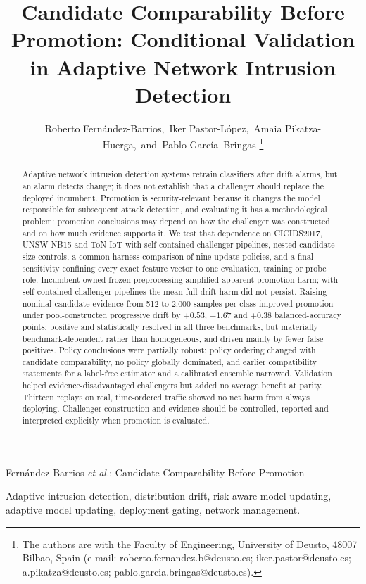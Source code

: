 \documentclass[journal]{IEEEtran}
\begin{document}
\title{Candidate Comparability Before Promotion: Conditional Validation in Adaptive Network Intrusion Detection}
\author{Roberto Fern\'andez-Barrios,~Iker Pastor-L\'opez,~Amaia Pikatza-Huerga,~and~Pablo Garc\'ia~Bringas%
\thanks{The authors are with the Faculty of Engineering, University of Deusto, 48007 Bilbao, Spain
(e-mail: roberto.fernandez.b@deusto.es; iker.pastor@deusto.es; a.pikatza@deusto.es; pablo.garcia.bringas@deusto.es).}}
%
{Fern\'andez-Barrios \MakeLowercase{\textit{et al.}}: Candidate Comparability Before Promotion}
\maketitle
\begin{abstract}
Adaptive network intrusion detection systems retrain classifiers after drift alarms, but an alarm detects change; it does not establish that a challenger should replace the deployed incumbent. Promotion is security-relevant because it changes the model responsible for subsequent attack detection, and evaluating it has a methodological problem: promotion conclusions may depend on how the challenger was constructed and on how much evidence supports it. We test that dependence on CICIDS2017, UNSW-NB15 and ToN-IoT with self-contained challenger pipelines, nested candidate-size controls, a common-harness comparison of nine update policies, and a final sensitivity confining every exact feature vector to one evaluation, training or probe role. Incumbent-owned frozen preprocessing amplified apparent promotion harm; with self-contained challenger pipelines the mean full-drift harm did not persist. Raising nominal candidate evidence from 512 to 2{,}000 samples per class improved promotion under pool-constructed progressive drift by $+0.53$, $+1.67$ and $+0.38$ balanced-accuracy points: positive and statistically resolved in all three benchmarks, but materially benchmark-dependent rather than homogeneous, and driven mainly by fewer false positives. Policy conclusions were partially robust: policy ordering changed with candidate comparability, no policy globally dominated, and earlier compatibility statements for a label-free estimator and a calibrated ensemble narrowed. Validation helped evidence-disadvantaged challengers but added no average benefit at parity. Thirteen replays on real, time-ordered traffic showed no net harm from always deploying. Challenger construction and evidence should be controlled, reported and interpreted explicitly when promotion is evaluated.
\end{abstract}
\begin{IEEEkeywords}
Adaptive intrusion detection, distribution drift, risk-aware model updating, adaptive model updating, deployment gating, network management.
\end{IEEEkeywords}
\IEEEpeerreviewmaketitle
\end{document}
